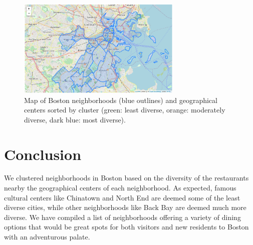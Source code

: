 \documentclass[11pt, a4paper]{article} %
\begin{document}
\begin{figure}
\begin{center}
\includegraphics[width=0.7\textwidth]{final_clustering.png}
\end{center}
\caption{Map of Boston neighborhoods (blue outlines) and geographical centers sorted by cluster (green: least diverse, orange: moderately diverse, dark blue: most diverse).}
\end{figure}

\section{Conclusion}
We clustered neighborhoods in Boston based on the diversity of the restaurants nearby the geographical centers of each neighborhood.
As expected, famous cultural centers like Chinatown and North End are deemed some of the least diverse cities, while other neighborhoods like Back Bay are deemed much more diverse.
We have compiled a list of neighborhoods offering a variety of dining options that would be great spots for both visitors and new residents to Boston with an adventurous palate.


\end{document}

